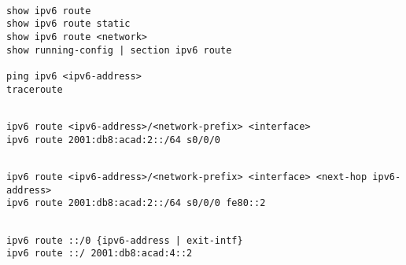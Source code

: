 \documentclass[../EngineeringJournal_CDavis.tex]{subfiles}
\begin{document}

\hspace{0.2cm}
\begin{tcolorbox}[width=6.3in]
\scriptsize
\begin{verbatim}

show ipv6 route
show ipv6 route static
show ipv6 route <network>
show running-config | section ipv6 route

ping ipv6 <ipv6-address>
traceroute

\end{verbatim}
\normalsize
\end{tcolorbox}
\hspace{0.2cm}


\hspace{0.2cm}
\begin{tcolorbox}[width=6.3in]
\scriptsize
\begin{verbatim}

ipv6 route <ipv6-address>/<network-prefix> <interface>
ipv6 route 2001:db8:acad:2::/64 s0/0/0

\end{verbatim}
\normalsize
\end{tcolorbox}
\hspace{0.2cm}

\clearpage


\hspace{0.2cm}
\begin{tcolorbox}[width=6.3in]
\scriptsize
\begin{verbatim}

ipv6 route <ipv6-address>/<network-prefix> <interface> <next-hop ipv6-address>
ipv6 route 2001:db8:acad:2::/64 s0/0/0 fe80::2

\end{verbatim}
\normalsize
\end{tcolorbox}
\hspace{0.2cm}


\hspace{0.2cm}
\begin{tcolorbox}[width=6.3in]
\scriptsize
\begin{verbatim}

ipv6 route ::/0 {ipv6-address | exit-intf}
ipv6 route ::/ 2001:db8:acad:4::2

\end{verbatim}
\normalsize
\end{tcolorbox}
\hspace{0.2cm}
\end{document}
